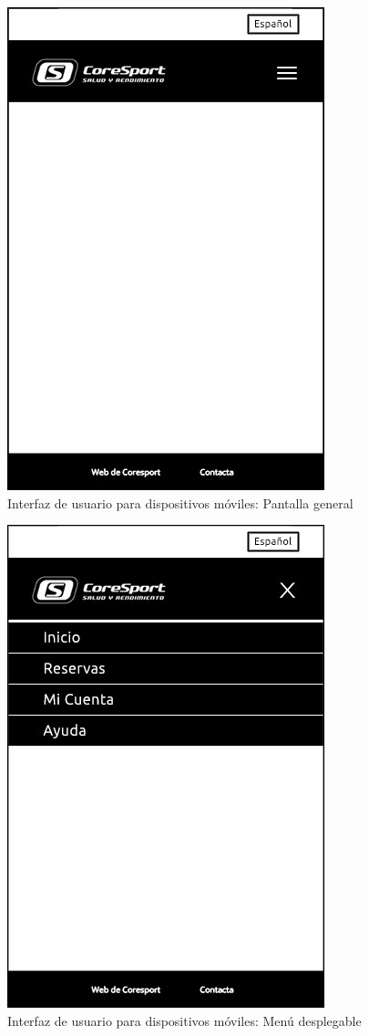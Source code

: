 \begin{figure}[H]
\centering
  \includegraphics[scale=.50]{img/interfaz/pantalla-principal-movil.jpg}
  \caption{Interfaz de usuario para dispositivos móviles: Pantalla general}
  \label{fig:interfaz-pantalla-principal-movil}
\end{figure}

\begin{figure}[H]
\centering
  \includegraphics[scale=.50]{img/interfaz/menu-movil.jpg}
  \caption{Interfaz de usuario para dispositivos móviles: Menú desplegable}
  \label{fig:interfaz-menu-movil}
\end{figure}


